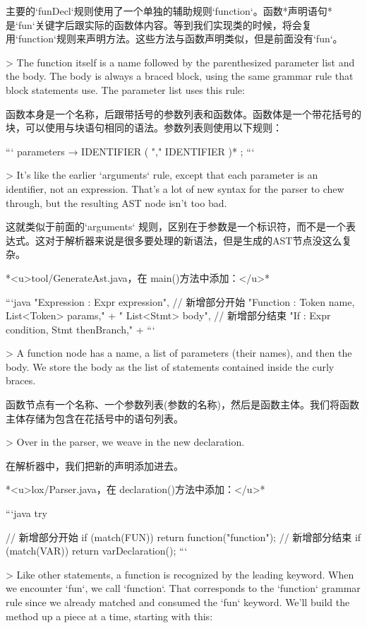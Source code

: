 \documentclass[cn,11pt,chinese]{elegantbook}
\begin{document}
{{{{主要的`funDecl`规则使用了一个单独的辅助规则`function`。函数*声明语句*是`fun`关键字后跟实际的函数体内容。等到我们实现类的时候，将会复用`function`规则来声明方法。这些方法与函数声明类似，但是前面没有`fun`。

> The function itself is a name followed by the parenthesized parameter list and the body. The body is always a braced block, using the same grammar rule that block statements use. The parameter list uses this rule:

函数本身是一个名称，后跟带括号的参数列表和函数体。函数体是一个带花括号的块，可以使用与块语句相同的语法。参数列表则使用以下规则：

```
parameters     → IDENTIFIER ( "," IDENTIFIER )* ;
```

> It’s like the earlier `arguments` rule, except that each parameter is an identifier, not an expression. That’s a lot of new syntax for the parser to chew through, but the resulting AST node isn’t too bad.

这就类似于前面的`arguments` 规则，区别在于参数是一个标识符，而不是一个表达式。这对于解析器来说是很多要处理的新语法，但是生成的AST节点没这么复杂。

*<u>tool/GenerateAst.java，在 main()方法中添加：</u>*

```java
      "Expression : Expr expression",
      // 新增部分开始
      "Function   : Token name, List<Token> params," +
                  " List<Stmt> body",
      // 新增部分结束           
      "If         : Expr condition, Stmt thenBranch," +
```

> A function node has a name, a list of parameters (their names), and then the body. We store the body as the list of statements contained inside the curly braces.

函数节点有一个名称、一个参数列表(参数的名称)，然后是函数主体。我们将函数主体存储为包含在花括号中的语句列表。

> Over in the parser, we weave in the new declaration.

在解析器中，我们把新的声明添加进去。

*<u>lox/Parser.java，在 declaration()方法中添加：</u>*

```java
    try {
      // 新增部分开始
      if (match(FUN)) return function("function");
      // 新增部分结束
      if (match(VAR)) return varDeclaration();
```

> Like other statements, a function is recognized by the leading keyword. When we encounter `fun`, we call `function`. That corresponds to the `function` grammar rule since we already matched and consumed the `fun` keyword. We’ll build the method up a piece at a time, starting with this:

}}}}}
\end{document}
